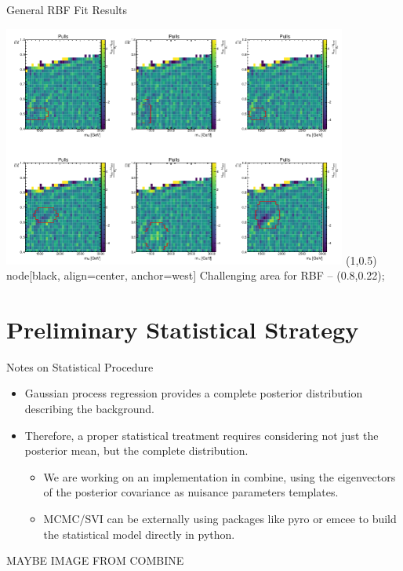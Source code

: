 \documentclass[10pt]{beamer}
\begin{document}
\begin{frame}{General RBF Fit Results}
  \begin{center}
    \begin{annotimage}{\includegraphics[width=0.85\textwidth]{figures/grbf_results}}
       (1,0.5) node[black, align=center, anchor=west] {{\tiny Challenging area for RBF}} -- (0.8,0.22);
    \end{annotimage}
  \end{center}
\end{frame}

\section[Statistical Considerations]{Preliminary Statistical Strategy}

\begin{frame}{Notes on Statistical Procedure}
  \begin{itemize}
  \item Gaussian process regression provides a complete posterior distribution describing the background. 
  \item Therefore, a proper statistical treatment requires considering not just the posterior mean, but the complete distribution.
    \begin{itemize}
    \item We are working on an implementation in combine, using the eigenvectors of the posterior covariance as nuisance parameters templates. 
    \item MCMC/SVI can be externally using packages like pyro or emcee to build the statistical model directly in python.
    \end{itemize}
  \end{itemize}

  MAYBE IMAGE FROM COMBINE
\end{frame}
\end{document}
